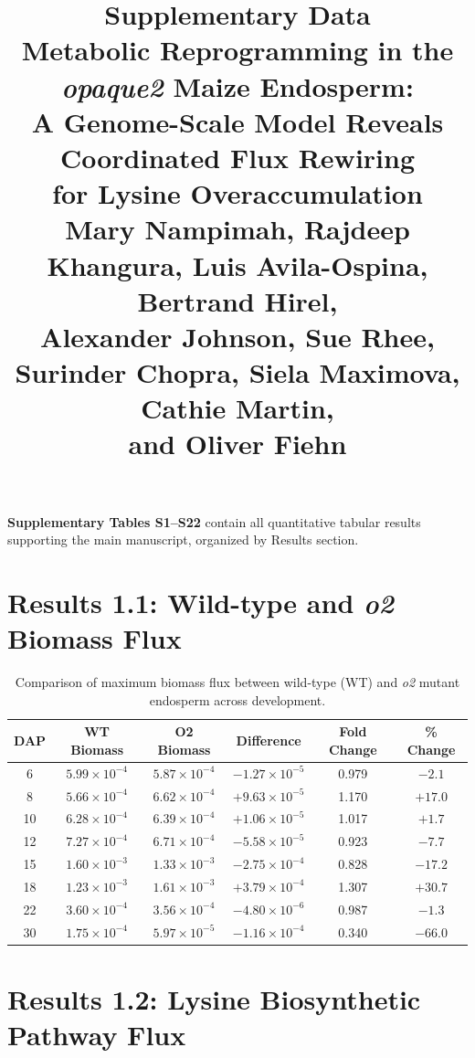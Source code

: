 \documentclass[11pt,letterpaper]{article}
\title{\textbf{Supplementary Data}\\[0.5em]
\large Metabolic Reprogramming in the \textit{opaque2} Maize Endosperm:\\
A Genome-Scale Model Reveals Coordinated Flux Rewiring\\
for Lysine Overaccumulation\\[1.5em]
\normalsize Mary Nampimah, Rajdeep Khangura, Luis Avila-Ospina, Bertrand Hirel,\\
Alexander Johnson, Sue Rhee, Surinder Chopra, Siela Maximova, Cathie Martin,\\
and Oliver Fiehn}
\date{}
\begin{document}
\maketitle
\vspace{1em}
\textbf{Supplementary Tables S1--S22} contain all quantitative tabular results
supporting the main manuscript, organized by Results section.

\tableofcontents
\clearpage

\section{Results 1.1: Wild-type and \textit{o2} Biomass Flux}

\begin{table}[H]
\centering
\caption{Comparison of maximum biomass flux between wild-type (WT) and \textit{o2} mutant endosperm across development.}
\label{stab:biomass}
\begin{tabular}{cccccc}
\toprule
DAP & WT Biomass & O2 Biomass & Difference & Fold Change & \% Change \\
\midrule
6  & $5.99 \times 10^{-4}$ & $5.87 \times 10^{-4}$ & $-1.27 \times 10^{-5}$ & 0.979 & $-2.1$ \\
8  & $5.66 \times 10^{-4}$ & $6.62 \times 10^{-4}$ & $+9.63 \times 10^{-5}$ & 1.170 & $+17.0$ \\
10 & $6.28 \times 10^{-4}$ & $6.39 \times 10^{-4}$ & $+1.06 \times 10^{-5}$ & 1.017 & $+1.7$ \\
12 & $7.27 \times 10^{-4}$ & $6.71 \times 10^{-4}$ & $-5.58 \times 10^{-5}$ & 0.923 & $-7.7$ \\
15 & $1.60 \times 10^{-3}$ & $1.33 \times 10^{-3}$ & $-2.75 \times 10^{-4}$ & 0.828 & $-17.2$ \\
18 & $1.23 \times 10^{-3}$ & $1.61 \times 10^{-3}$ & $+3.79 \times 10^{-4}$ & 1.307 & $+30.7$ \\
22 & $3.60 \times 10^{-4}$ & $3.56 \times 10^{-4}$ & $-4.80 \times 10^{-6}$ & 0.987 & $-1.3$ \\
30 & $1.75 \times 10^{-4}$ & $5.97 \times 10^{-5}$ & $-1.16 \times 10^{-4}$ & 0.340 & $-66.0$ \\
\bottomrule
\end{tabular}
\end{table}

\clearpage


\section{Results 1.2: Lysine Biosynthetic Pathway Flux}
\end{document}
